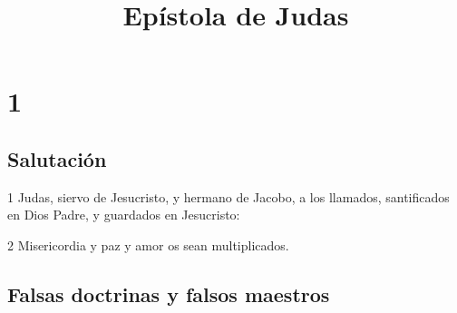 
\title{Epístola de Judas}

\chapter{1}

\section*{Salutación}

\par 1 Judas, siervo de Jesucristo, y hermano de Jacobo, a los llamados, santificados en Dios Padre, y guardados en Jesucristo:
\par 2 Misericordia y paz y amor os sean multiplicados.

\section*{Falsas doctrinas y falsos maestros}

